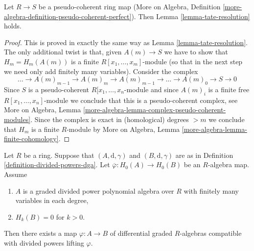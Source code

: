 \begin{lemma}
\label{lemma-tate-resoluton-pseudo-coherent-ring-map}
Let $R \to S$ be a pseudo-coherent ring map (More on Algebra, Definition
\ref{more-algebra-definition-pseudo-coherent-perfect}). Then
Lemma \ref{lemma-tate-resolution} holds.
\end{lemma}

\begin{proof}
This is proved in exactly the same way as Lemma \ref{lemma-tate-resolution}.
The only additional twist is that, given $A(m) \to S$ we have to
show that $H_m = H_m(A(m))$ is a finite $R[x_1, \ldots, x_m]$-module
(so that in the next step we need only add finitely many variables).
Consider the complex
$$
\ldots \to A(m)_{m - 1} \to A(m)_m \to A(m)_{m - 1} \to
\ldots \to A(m)_0 \to S \to 0
$$
Since $S$ is a pseudo-coherent $R[x_1, \ldots, x_n$-module
and since $A(m)_i$ is a finite free $R[x_1, \ldots, x_n]$-module
we conclude that this is a pseudo-coherent complex, see
More on Algebra, Lemma \ref{more-algebra-lemma-complex-pseudo-coherent-modules}.
Since the complex is exact in (homological) degrees $> m$
we conclude that $H_m$ is a finite $R$-module by
More on Algebra, Lemma \ref{more-algebra-lemma-finite-cohomology}.
\end{proof}

\begin{lemma}
\label{lemma-uniqueness-tate-resolution}
Let $R$ be a ring. Suppose that $(A, \text{d}, \gamma)$ and
$(B, \text{d}, \gamma)$ are as in
Definition \ref{definition-divided-powers-dga}.
Let $\overline{\varphi} : H_0(A) \to H_0(B)$ be an $R$-algebra map.
Assume
\begin{enumerate}
\item $A$ is a graded divided power polynomial algebra over $R$
with finitely many variables in each degree,
\item $H_k(B) = 0$ for $k > 0$.
\end{enumerate}
Then there exists a map $\varphi : A \to B$ of differential
graded $R$-algebras compatible with divided powers
lifting $\varphi$.
\end{lemma}

